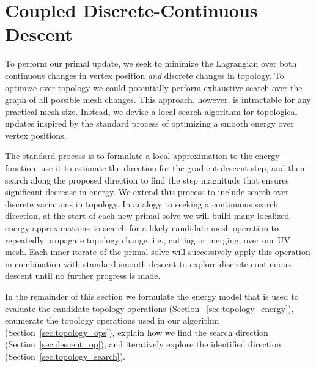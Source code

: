 
\section{Coupled Discrete-Continuous Descent}
\label{sec:topologySearch}
To perform our primal update, we seek to minimize the Lagrangian over both continuous changes in vertex position \emph{and} discrete changes in topology. 
%
To optimize over topology we could potentially perform exhaustive search over the graph of all possible mesh changes. This approach, however, is intractable for any practical mesh size. 
%
Instead, we devise a local search algorithm for topological updates inspired by the standard process of optimizing a smooth energy over vertex positions. 

%
The standard process is to formulate a local approximation to the energy function, use it to estimate the direction for the gradient descent step, and then search along the proposed direction to find the step magnitude that ensures significant decrease in energy. 
%
We extend this process to include search over discrete variations in topology. In analogy to seeking a continuous search direction, at the start of each new primal solve we will build many localized energy approximations to search for a likely candidate mesh operation to repeatedly propagate topology change, i.e., cutting or merging, over our UV mesh. Each inner iterate of the primal solve will successively apply this operation in combination with standard smooth descent to explore discrete-continuous descent until no further progress is made.%

In the remainder of this section we formulate the energy model that is used to evaluate the candidate topology operations (Section ~\ref{sec:topology_energy}), 
enumerate the topology operations used in our algorithm (Section~\ref{sec:topology_ops}), explain how we find the search direction (Section~\ref{sec:descent_op}), and iteratively explore the identified direction (Section~\ref{sec:topology_search}).

